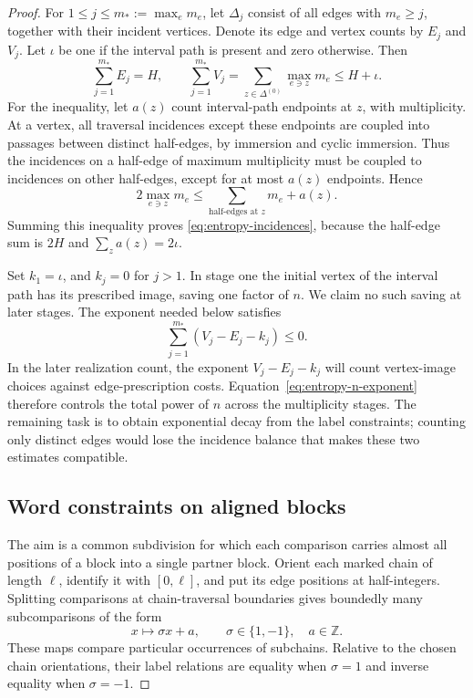 \begin{proof}
For \(1\le j\le m_*:=\max_e m_e\), let \(\Delta_j\) consist of all edges
with \(m_e\ge j\), together with their incident vertices.  Denote its
edge and vertex counts by \(E_j\) and \(V_j\).  Let \(\iota\) be one if
the interval path is present and zero otherwise.  Then
\begin{equation}
 \sum_{j=1}^{m_*}E_j=H,\qquad
 \sum_{j=1}^{m_*}V_j
 =\sum_{z\in\Delta^{(0)}}\max_{e\ni z}m_e
 \le H+\iota.
 \label{eq:entropy-incidences}
\end{equation}
For the inequality, let \(a(z)\) count interval-path endpoints at \(z\),
with multiplicity.  At a vertex, all traversal incidences except these
endpoints are coupled into passages between distinct half-edges, by
immersion and cyclic immersion.  Thus the incidences on a half-edge
of maximum multiplicity must be coupled to incidences on other
half-edges, except for at most \(a(z)\) endpoints.  Hence
\[
 2\max_{e\ni z}m_e
 \le \sum_{\text{half-edges at }z}m_e+a(z).
\]
Summing this inequality proves \eqref{eq:entropy-incidences}, because the
half-edge sum is \(2H\) and \(\sum_z a(z)=2\iota\).

Set \(k_1=\iota\), and \(k_j=0\) for \(j>1\).  In stage one the initial
vertex of the interval path has its prescribed image, saving one factor
of \(n\).  We claim no such saving at later stages.  The exponent needed
below satisfies
\begin{equation}
 \sum_{j=1}^{m_*}(V_j-E_j-k_j)\le0.
 \label{eq:entropy-n-exponent}
\end{equation}
In the later realization count, the exponent \(V_j-E_j-k_j\) will
count vertex-image choices against edge-prescription costs.
Equation~\eqref{eq:entropy-n-exponent} therefore controls the total
power of \(n\) across the multiplicity stages.
The remaining task is to obtain exponential decay from the label
constraints; counting only distinct edges would lose the incidence
balance that makes these two estimates compatible.

\subsection*{Word constraints on aligned blocks}
The aim is a common subdivision for which each comparison carries almost
all positions of a block into a single partner block. Orient each marked chain of length \(\ell\), identify it with
\([0,\ell]\), and put its edge positions at half-integers.  Splitting
comparisons at chain-traversal boundaries gives boundedly many
subcomparisons of the form
\[
 x\longmapsto\sigma x+a,\qquad \sigma\in\{1,-1\},\quad a\in\mathbb Z.
\]
These maps compare particular occurrences of subchains.  Relative to
the chosen chain orientations, their label relations are equality when
\(\sigma=1\) and inverse equality when \(\sigma=-1\).


\end{proof}
